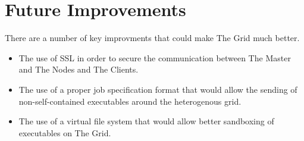 \chapter{Future Improvements}
\label{futureimprovements}

There are a number of key improvments that could make The Grid much better.

\begin{itemize}
\item The use of SSL in order to secure the communication between The Master and The Nodes and The Clients.

\item The use of a proper job specification format that would allow the sending of non-self-contained executables around the heterogenous grid.

\item The use of a virtual file system that would allow better sandboxing of executables on The Grid.

\end{itemize}
